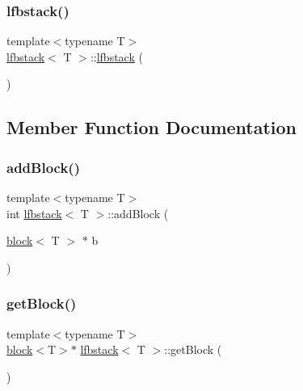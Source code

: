 \subsubsection{\texorpdfstring{lfbstack()}{lfbstack()}}
{\footnotesize\ttfamily template$<$typename T$>$ \\
\hyperlink{classlfbstack}{lfbstack}$<$ T $>$\+::\hyperlink{classlfbstack}{lfbstack} (\begin{DoxyParamCaption}{ }\end{DoxyParamCaption})\hspace{0.3cm}{\ttfamily [inline]}}



\subsection{Member Function Documentation}
\mbox{\label{classlfbstack_a82d5afa49bef74cb2cc06a5a8a6e10c8}} 
\subsubsection{\texorpdfstring{add\+Block()}{addBlock()}}
{\footnotesize\ttfamily template$<$typename T$>$ \\
int \hyperlink{classlfbstack}{lfbstack}$<$ T $>$\+::add\+Block (\begin{DoxyParamCaption}\item[{\hyperlink{classblock}{block}$<$ T $>$ $\ast$}]{b }\end{DoxyParamCaption})\hspace{0.3cm}{\ttfamily [inline]}}

\mbox{\label{classlfbstack_a8b78f1dc42e697c2f792cc31be0b532a}} 
\subsubsection{\texorpdfstring{get\+Block()}{getBlock()}}
{\footnotesize\ttfamily template$<$typename T$>$ \\
\hyperlink{classblock}{block}$<$T$>$$\ast$ \hyperlink{classlfbstack}{lfbstack}$<$ T $>$\+::get\+Block (\begin{DoxyParamCaption}{ }\end{DoxyParamCaption})\hspace{0.3cm}{\ttfamily [inline]}}


